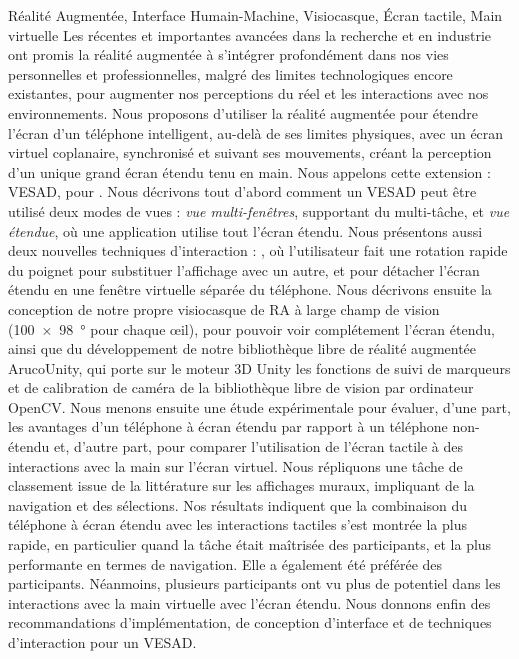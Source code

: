 \begin{sommaire}{Réalité Augmentée, Interface Humain-Machine, Visiocasque, Écran tactile, Main virtuelle}
  Les récentes et importantes avancées dans la recherche et en industrie ont promis la réalité augmentée à s'intégrer profondément dans nos vies personnelles et professionnelles, malgré des limites technologiques encore existantes, pour augmenter nos perceptions du réel et les interactions avec nos environnements.
  Nous proposons d'utiliser la réalité augmentée pour étendre l'écran d'un téléphone intelligent, au-delà de ses limites physiques, avec un écran virtuel coplanaire, synchronisé et suivant ses mouvements, créant la perception d'un unique grand écran étendu tenu en main. Nous appelons cette extension : VESAD, pour .
  Nous décrivons tout d'abord comment un VESAD peut être utilisé deux modes de vues : \emph{vue multi-fenêtres}, supportant du multi-tâche, et \emph{vue étendue}, où une application utilise tout l'écran étendu.
  Nous présentons aussi deux nouvelles techniques d'interaction : , où l'utilisateur fait une rotation rapide du poignet pour substituer l'affichage avec un autre, et  pour détacher l'écran étendu en une fenêtre virtuelle séparée du téléphone.
  Nous décrivons ensuite la conception de notre propre visiocasque de RA à large champ de vision (\SI{100x98}{\degree} pour chaque œil), pour pouvoir voir complétement l'écran étendu, ainsi que du développement de notre bibliothèque libre de réalité augmentée ArucoUnity, qui porte sur le moteur 3D Unity les fonctions de suivi de marqueurs et de calibration de caméra de la bibliothèque libre de vision par ordinateur OpenCV.
  Nous menons ensuite une étude expérimentale pour évaluer, d'une part, les avantages d'un téléphone à écran étendu par rapport à un téléphone non-étendu et, d'autre part, pour comparer l'utilisation de l'écran tactile à des interactions avec la main sur l'écran virtuel. Nous répliquons une tâche de classement issue de la littérature sur les affichages muraux, impliquant de la navigation et des sélections.
  Nos résultats indiquent que la combinaison du téléphone à écran étendu avec les interactions tactiles s'est montrée la plus rapide, en particulier quand la tâche était maîtrisée des participants, et la plus performante en termes de navigation. Elle a également été préférée des participants. Néanmoins, plusieurs participants ont vu plus de potentiel dans les interactions avec la main virtuelle avec l'écran étendu.
  Nous donnons enfin des recommandations d'implémentation, de conception d'interface et de techniques d'interaction pour un VESAD.
\end{sommaire}

